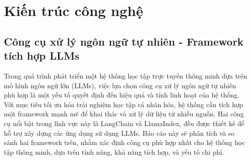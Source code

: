 \section{Kiến trúc công nghệ}
\subsection{Công cụ xử lý ngôn ngữ tự nhiên - Framework tích hợp LLMs}
Trong quá trình phát triển một hệ thống học tập trực tuyến thông minh dựa trên mô hình ngôn ngữ lớn (LLMs), việc lựa chọn công cụ xử lý ngôn ngữ tự nhiên phù hợp là một yếu tố quyết định đến hiệu quả và tính linh hoạt của hệ thống. Với mục tiêu tối ưu hóa trải nghiệm học tập cá nhân hóa, hệ thống cần tích hợp một framework mạnh mẽ để khai thác và xử lý dữ liệu từ nhiều nguồn. Hai công cụ nổi bật trong lĩnh vực này là LangChain và LlamaIndex, đều được thiết kế để hỗ trợ xây dựng các ứng dụng sử dụng LLMs. Báo cáo này sẽ phân tích và so sánh hai framework trên, nhằm xác định công cụ phù hợp nhất cho hệ thống học tập thông minh, dựa trên tính năng, khả năng tích hợp, và yếu tố chi phí.
